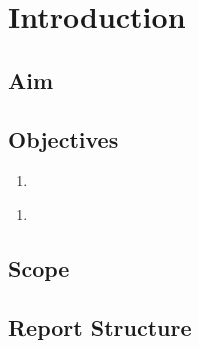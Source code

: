 \chapter{Introduction}
\label{intro}

\section{Aim}

\section{Objectives}

\begin{enumerate}
    \item
\end{enumerate}

\begin{enumerate}
    \item
\end{enumerate}

\section{Scope}

\section{Report Structure}
